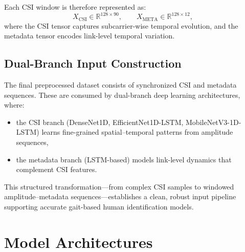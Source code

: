 Each CSI window is therefore represented as:
\[
X_{\text{CSI}} \in \mathbb{R}^{128 \times 90},
\qquad
X_{\text{META}} \in \mathbb{R}^{128 \times 12},
\]
where the CSI tensor captures subcarrier-wise temporal evolution, and the metadata tensor encodes link-level temporal variation.

\subsection{Dual-Branch Input Construction}

The final preprocessed dataset consists of synchronized CSI and metadata sequences. These are consumed by dual-branch deep learning architectures, where:
\begin{itemize}
    \item the CSI branch (DenseNet1D, EfficientNet1D-LSTM, MobileNetV3-1D-LSTM) learns fine-grained spatial–temporal patterns from amplitude sequences,
    \item the metadata branch (LSTM-based) models link-level dynamics that complement CSI features.
\end{itemize}

This structured transformation—from complex CSI samples to windowed amplitude–metadata sequences—establishes a clean, robust input pipeline supporting accurate gait-based human identification models.


\section{Model Architectures}

